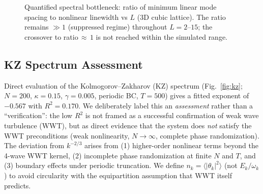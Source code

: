 \documentclass[aps,pre,12pt]{revtex4-2}
\begin{document}
\begin{figure}[htbp]
\centering
{}
\caption{Quantified spectral bottleneck: ratio of minimum linear mode spacing to nonlinear linewidth vs $L$ (3D cubic lattice). The ratio remains $\gg1$ (suppressed regime) throughout $L=2$--$15$; the crossover to ratio$\,{\approx}\,1$ is not reached within the simulated range.}
\label{fig:bottleneck}
\end{figure}

\subsection{KZ Spectrum Assessment}

Direct evaluation of the Kolmogorov--Zakharov (KZ) spectrum (Fig.~\ref{fig:kz}; $N=200$, $\kappa=0.15$, $\gamma=0.005$, periodic BC, $T=500$) gives a fitted exponent of $-0.567$ with $R^2=0.170$. We deliberately label this an \emph{assessment} rather than a ``verification'': the low $R^2$ is not framed as a successful confirmation of weak wave turbulence (WWT), but as direct evidence that the system does \emph{not} satisfy the WWT preconditions (weak nonlinearity, $N\to\infty$, complete phase randomization). The deviation from $k^{-2/3}$ arises from (1) higher-order nonlinear terms beyond the 4-wave WWT kernel, (2) incomplete phase randomization at finite $N$ and $T$, and (3) boundary effects under periodic truncation. We define $n_k=\langle|\theta_k|^2\rangle$ (not $E_k/\omega_k$) to avoid circularity with the equipartition assumption that WWT itself predicts.
\end{document}
